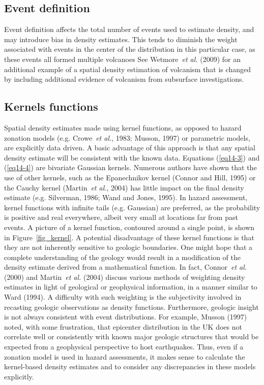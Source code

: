 \documentclass[10pt]{article}
\begin{document}
\subsection{Event definition}
Event definition affects the total number of events used to estimate density, and may introduce bias in density estimates. This tends to diminish the weight associated with events in the center of the distribution in this particular case, as these events all formed multiple volcanoes See Wetmore~{\it et al.} (2009) for an additional example of a spatial density estimation of volcanism that is changed by including additional evidence of volcanism from subsurface investigations.

\subsection{Kernels functions}
Spatial density estimates made using kernel functions, as opposed to hazard zonation models (e.g. Crowe~{\it et al.}, 1983; Musson, 1997) or parametric models, are explicitly data driven. A basic advantage of this approach is that any spatial density estimate will be consistent with the known data. Equations (\ref{eq14-3}) and (\ref{eq14-4}) are bivariate Gaussian kernels. Numerous authors have shown that the use of other kernels, such as the Epanechnikov kernel  (Connor and Hill, 1995) or the Cauchy kernel (Martin~{\it et al.}, 2004)  has little impact on the final density estimate (e.g. Silverman, 1986; Wand and Jones, 1995). In hazard assessment, kernel functions with infinite tails (e.g. Gaussian) are preferred, as the probability is positive and real everywhere, albeit very small at locations far from past events. A picture of a kernel function, contoured around a single point, is shown in Figure~\ref{fig_kernel}. A potential disadvantage of these kernel functions is that they are not inherently sensitive to geologic boundaries. One might hope that a complete understanding of the geology would result in a modification of the density estimate derived from a mathematical function. In fact, Connor~{\it et al.} (2000) and Martin~{\it et al.} (2004) discuss various methods of weighting density estimates in light of geological or geophysical information, in a manner similar to Ward (1994). A difficulty with such weighting is the subjectivity involved in recasting geologic observations as density functions. Furthermore, geologic insight is not always consistent with event distributions. For example, Musson (1997) noted, with some frustration, that epicenter distribution in the UK does not correlate well or consistently with known major geologic structures that would be expected from a geophysical perspective to host earthquakes. Thus, even if a zonation model is used in hazard assessments, it makes sense to calculate the kernel-based density estimates and to consider any discrepancies in these models explicitly.
\end{document}
